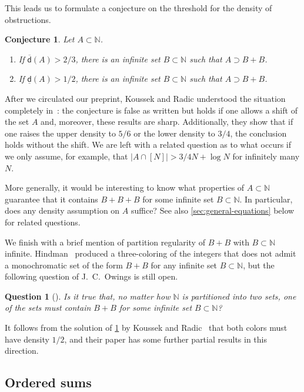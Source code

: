 \documentclass[10pt,dvipsnames]{article}
\newtheorem{conjecture}[theorem]{Conjecture}
\newtheorem{question}[theorem]{Question}
\theoremstyle{definition}
\theoremstyle{plain}
\newcommand{\N}{\mathbb{N}}
\newcommand{\udens}{\overline{\mathsf{d}}}
\newcommand{\ldens}{\underline{\mathsf{d}}}
\begin{document}
This leads us to formulate a conjecture on the threshold for the density of obstructions.
\begin{conjecture}
\label{question_unrestricted_density_greater_than_half}Let $A\subset\N$.
\begin{enumerate}
    \item If $\udens(A)>2/3$,  there is an infinite set $B\subset\N$ such that $A\supset B+B$.
    \item If $\ldens(A)>1/2$,  there is an infinite set $B\subset\N$ such that $A\supset B+B$.
\end{enumerate}
\end{conjecture}
After we circulated our preprint, Koussek and  Radic understood the situation completely in~\cite{KR}: the conjecture is false as written but holds if one allows a shift of the set $A$  and, moreover, these results are sharp.  Additionally, they show that if one raises the upper density to $5/6$ or the lower density to $3/4$, the conclusion holds without the shift. 
We are left with a related question as to what occurs if we only assume, for example, that $|A\cap[N]|>3/4N+\log N$ for infinitely many $N$.

More generally, it would be interesting to know what properties of $A \subset \N$ guarantee that it contains $B+B+B$ for some infinite set $B \subset \N$. In particular, does any density assumption on $A$ suffice?
See also \cref{sec:general-equations} below for related questions.

We finish with a brief mention of partition regularity of $B+B$ with $B \subset \N$ infinite.
Hindman~\cite[Section 2]{Hindman1979-another} produced a three-coloring of the integers that does not admit a monochromatic set of the form $B+B$ for any infinite set $B\subset\N$, but the following question of J.\ C.\ Owings is still open.

\begin{question}[{\cite[Problem~E2494]{AmerMathMon1974Oct}}]
Is it true that, no matter how $\N$ is partitioned into two sets, one of the sets must contain $B+B$ for some infinite set $B \subset \N$?
\end{question}
It follows from the solution of 
\cref{question_unrestricted_density_greater_than_half}  by Koussek and Radic~\cite{KR} that both colors must have density $1/2$, and their paper has some further partial results in this direction.

\subsection{Ordered sums}
\label{sec:ordered}
\end{document}
